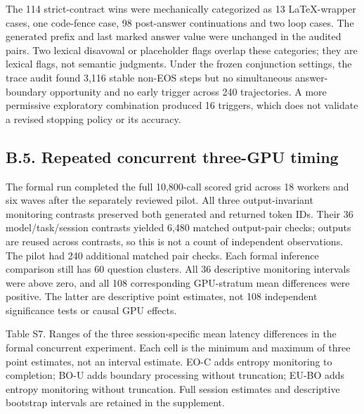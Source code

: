 \documentclass[
  12pt,
  a4paper,
]{article}
\begin{document}
The 114 strict-contract wins were mechanically categorized as 13
LaTeX-wrapper cases, one code-fence case, 98 post-answer continuations
and two loop cases. The generated prefix and last marked answer value
were unchanged in the audited pairs. Two lexical disavowal or
placeholder flags overlap these categories; they are lexical flags, not
semantic judgments. Under the frozen conjunction settings, the trace
audit found 3,116 stable non-EOS steps but no simultaneous
answer-boundary opportunity and no early trigger across 240
trajectories. A more permissive exploratory combination produced 16
triggers, which does not validate a revised stopping policy or its
accuracy.

\subsection{B.5. Repeated concurrent three-GPU
timing}\label{b.5.-repeated-concurrent-three-gpu-timing}

The formal run completed the full 10,800-call scored grid across 18
workers and six waves after the separately reviewed pilot. All three
output-invariant monitoring contrasts preserved both generated and
returned token IDs. Their 36 model/task/session contrasts yielded 6,480
matched output-pair checks; outputs are reused across contrasts, so this
is not a count of independent observations. The pilot had 240 additional
matched pair checks. Each formal inference comparison still has 60
question clusters. All 36 descriptive monitoring intervals were above
zero, and all 108 corresponding GPU-stratum mean differences were
positive. The latter are descriptive point estimates, not 108
independent significance tests or causal GPU effects.

Table S7. Ranges of the three session-specific mean latency differences
in the formal concurrent experiment. Each cell is the minimum and
maximum of three point estimates, not an interval estimate. EO-C adds
entropy monitoring to completion; BO-U adds boundary processing without
truncation; EU-BO adds entropy monitoring without truncation. Full
session estimates and descriptive bootstrap intervals are retained in
the supplement.
\end{document}
